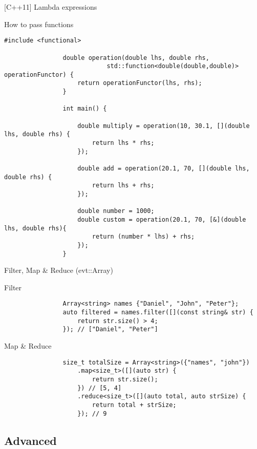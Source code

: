 \documentclass{beamer}
\newcommand{\normalSizeItem}[1] {
  \normalsize{\item #1}
}
\newcommand{\newFrameWithoutIndex}[1]{
	\begin{frame}
		#1
		\thispagestyle{empty}
	\end{frame}
}
\newcommand{\newSectionWithoutIndex}[1]{
	\newFrameWithoutIndex{\section{#1}}
}
\newcommand{\smallCite}[1]{
	\begin{small}
		\cite{#1}	
	\end{small}
}
\begin{document}
		\begin{frame}[fragile]{[C++11] Lambda expressions}			
			\begin{itemize}				
				\normalSizeItem { How to pass functions }
				\begin{lstlisting}[basicstyle={\tiny\ttfamily}]
				#include <functional>
				
				double operation(double lhs, double rhs, 
							std::function<double(double,double)> operationFunctor) {
					return operationFunctor(lhs, rhs);
				}
				
				int main() {
				
					double multiply = operation(10, 30.1, [](double lhs, double rhs) {
						return lhs * rhs;
					});
					
					double add = operation(20.1, 70, [](double lhs, double rhs) {
						return lhs + rhs;
					});
					
					double number = 1000;
					double custom = operation(20.1, 70, [&](double lhs, double rhs){
						return (number * lhs) + rhs;
					});
				}
				\end{lstlisting}
				
			\end{itemize}
		\end{frame}
		
		\begin{frame}[fragile]{Filter, Map \& Reduce (evt::Array)\smallCite{Array}}	
		
			\begin{itemize}
				\normalSizeItem { Filter }
				\begin{lstlisting}
				Array<string> names {"Daniel", "John", "Peter"};
				auto filtered = names.filter([](const string& str) {
					return str.size() > 4;
				}); // ["Daniel", "Peter"]
				\end{lstlisting}
				
				\normalSizeItem { Map \& Reduce }
				\begin{lstlisting}
				size_t totalSize = Array<string>({"names", "john"})
				    .map<size_t>([](auto str) {
					    return str.size();
				    }) // [5, 4]
				    .reduce<size_t>([](auto total, auto strSize) {
					    return total + strSize; 
				    }); // 9
				\end{lstlisting}
			\end{itemize}
		\end{frame}

		\newSectionWithoutIndex{Advanced}
	
\end{document}
